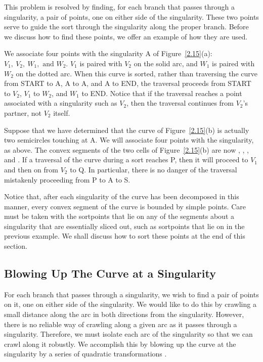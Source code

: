This problem is resolved by finding,
for each branch that passes through a singularity, a pair of points,
one on either side of the singularity.
These two points serve to guide the sort through the singularity along
the proper branch.
Before we discuss how to find these points, we offer an example of how they
are used.
%
%
\begin{example}
\label{eg-pseudo}
We associate four points with the singularity A of Figure~\ref{2.15}(a):
$V_{1},\ V_{2},\ W_{1}, \mbox{ and } W_{2}$.
$V_{1}$ is paired with $V_{2}$ on the solid arc, and 
$W_{1}$ is paired with $W_{2}$ on the dotted arc.
When this curve is sorted, rather than traversing the curve 
from START to A, A to A, and
A to END, the traversal proceeds 
from START to $V_{2}$, $V_{1}$ to $W_{2}$, and 
$W_{1}$ to END.
Notice that if the traversal reaches a point associated with a singularity 
such as $V_{2}$, then the traversal continues from
$V_{2}$'s partner, not $V_{2}$ itself.


Suppose that we have determined that the curve of Figure~\ref{2.15}(b) 
is actually two semicircles touching at A.
We will associate four points with the singularity, as above.
The convex segments of the two cells of Figure~\ref{2.15}(b) 
are now , , , and .
If a traversal of the curve during a sort reaches P, 
then it will proceed to $V_{1}$ and then on from $V_{2}$ to Q.
In particular, there is no danger of the traversal mistakenly
proceeding from P to A to S.
\end{example}
%

Notice that, after each singularity of the curve has been decomposed in this 
manner, every convex segment of the curve is bounded by simple points.
Care must be taken with the sortpoints that lie on any of the segments about
a singularity that are essentially sliced out, such as sortpoints that lie on
 in the previous example.
We shall discuss how to sort these points at the end of this section.
%
\subsection{Blowing Up The Curve at a Singularity}

For each branch that passes through a singularity, we wish to find a pair
of points on it, one on either side of the singularity.
We would like to do this by crawling a small distance along the arc in both
directions from the singularity.
However, there is no reliable way of crawling along a given arc as it passes
through a singularity. 
Therefore, we must isolate each arc of the singularity so that we can crawl
along it robustly.
We accomplish this by blowing up the curve at the singularity by a series
of quadratic transformations \cite{bhh,wa}.

